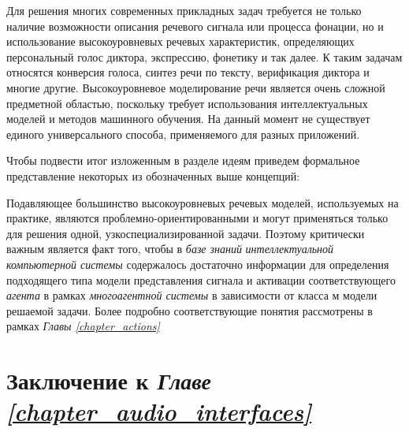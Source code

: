 Для решения многих современных прикладных задач требуется не только наличие возможности описания речевого сигнала или процесса фонации, но и использование высокоуровневых речевых характеристик, определяющих персональный голос диктора, экспрессию, фонетику и так далее. К таким задачам относятся конверсия голоса, синтез речи по тексту, верификация диктора и многие другие. Высокоуровневое моделирование речи является очень сложной предметной областью, поскольку требует использования интеллектуальных моделей и методов машинного обучения. На данный момент не существует единого универсального способа, применяемого для разных приложений.

Чтобы подвести итог изложенным в разделе идеям приведем формальное представление некоторых из обозначенных выше концепций:

\begin{SCn}
\begin{scnindent}
\end{scnindent}
\end{SCn}

Подавляющее большинство высокоуровневых речевых моделей, используемых на практике, являются проблемно-ориентированными и могут применяться только для решения одной, узкоспециализированной задачи. Поэтому критически важным является факт того, чтобы в \textit{базе знаний} \textit{интеллектуальной компьютерной системы} содержалось достаточно информации для определения подходящего типа модели представления сигнала и активации соответствующего \textit{агента} в рамках \textit{многоагентной системы} в зависимости от класса м модели решаемой задачи. Более подробно соответствующие понятия рассмотрены в рамках \textit{Главы \ref{chapter_actions}}


\section*{Заключение к \textit{Главе \ref{chapter_audio_interfaces}}}

